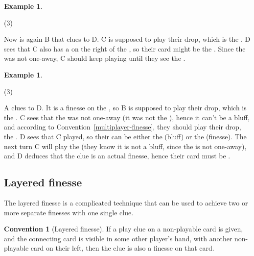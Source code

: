 \documentclass[a4paper]{article}
\theoremstyle{plain}
\theoremstyle{definition}
\newtheorem{example}[theorem]{Example}
\newtheorem{convention}[theorem]{Convention}
\begin{document}
\begin{example}
	\hfill
	\begin{tasks}(3)
		\task[+]      
		\task[A]    
		\task[B]    
		\task[C]    
		\task[D]    
		\task[E]    
	\end{tasks}
	
	Now is again B that clues  to D. C is supposed to play their drop, which is the . D sees that C also has a  on the right of the , so their card might be the . Since the  was not one-away, C should keep playing until they see the .
\end{example}

\begin{example}
	\hfill
	\begin{tasks}(3)
		\task[+]      
		\task[A]    
		\task[B]    
		\task[C]    
		\task[D]    
		\task[E]    
	\end{tasks}
	
	A clues  to D. It is a finesse on the , so B is supposed to play their drop, which is the . C sees that the  was not one-away (it was not the ), hence it can't be a bluff, and according to Convention~\ref{multiplayer-finesse}, they should play their drop, the . D sees that C played, so their  can be either the  (bluff) or the  (finesse). The next turn C will play the  (they know it is not a bluff, since the  is not one-away), and D deduces that the clue is an actual finesse, hence their card must be .
\end{example}

\subsection{Layered finesse}

The layered finesse is a complicated technique that can be used to achieve two or more separate finesses with one single clue.

\begin{convention}[Layered finesse]
	\label{layered-finesse}
	If a play clue on a non-playable card is given, and the connecting card is visible in some other player's hand, with another non-playable card on their left, then the clue is also a finesse on that card.
\end{convention}
\end{document}
